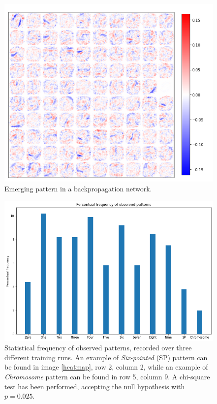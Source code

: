 \documentclass[a4paper]{report}
\begin{document}
\begin{figure} [H]
    \centering
    \includegraphics [width = 12cm] {h/backnet.png}
    \caption{Emerging pattern in a backpropagation network.}
    \label{backnet}
\end{figure}

\begin{figure} [H]
    \centering
    \includegraphics [width=12cm ] {o/bar2.png}
    \caption{Statistical frequency of observed patterns, recorded over three different training runs. An example of \textit{Six-pointed} (SP) pattern can be found in image \ref{heatmap}, row 2, column 2, while an example of \textit{Chromosome} pattern can be found in row 5, column 9. A chi-square test has been performed, accepting the null hypothesis with $p =0.025$.}
    \label{cerchio1}
\end{figure}
\end{document}
